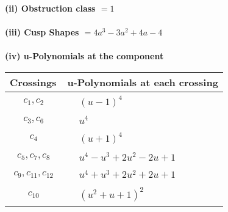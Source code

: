 \documentclass[1p]{elsarticle_modified}
\theoremstyle{definition}
\begin{document}
\flushleft \textbf{(ii) Obstruction class $= 1$}\\~\\
\flushleft \textbf{(iii) Cusp Shapes $= 4 a^3-3 a^2+4 a-4$}\\~\\
\newpage\renewcommand{\arraystretch}{1}
\flushleft \textbf{(iv) u-Polynomials at the component}\newline \\
\begin{tabular}{m{50pt}|m{274pt}}
Crossings & \hspace{64pt}u-Polynomials at each crossing \\
\hline $$\begin{aligned}c_{1},c_{2}\end{aligned}$$&$\begin{aligned}
&(u-1)^4
\end{aligned}$\\
\hline $$\begin{aligned}c_{3},c_{6}\end{aligned}$$&$\begin{aligned}
&u^4
\end{aligned}$\\
\hline $$\begin{aligned}c_{4}\end{aligned}$$&$\begin{aligned}
&(u+1)^4
\end{aligned}$\\
\hline $$\begin{aligned}c_{5},c_{7},c_{8}\end{aligned}$$&$\begin{aligned}
&u^4- u^3+2 u^2-2 u+1
\end{aligned}$\\
\hline $$\begin{aligned}c_{9},c_{11},c_{12}\end{aligned}$$&$\begin{aligned}
&u^4+u^3+2 u^2+2 u+1
\end{aligned}$\\
\hline $$\begin{aligned}c_{10}\end{aligned}$$&$\begin{aligned}
&(u^2+u+1)^2
\end{aligned}$\\
\hline
\end{tabular}\\~\\
\end{document}
